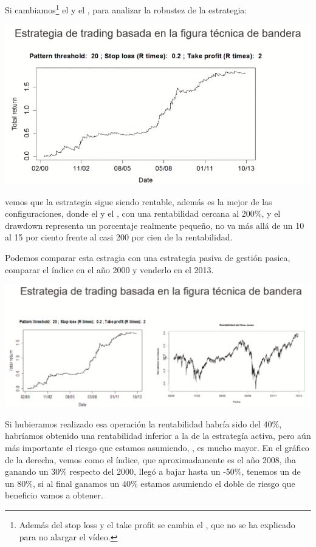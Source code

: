 \begin{enumerate}
    Si cambiamos\footnote{Además del stop loss y el take profit se cambia el , que no se ha explicado para no alargar el vídeo.} el  y el , para analizar la robustez de la estrategia:
    \begin{center}
        \includegraphics[scale=.65]{images/mod03-16.png}
    \end{center}
    vemos que la estrategia sigue siendo rentable, además es la mejor de las configuraciones, donde el  y el , con una rentabilidad cercana al 200\%, y el drawdown representa un porcentaje realmente pequeño, no va más allá de un 10 al 15 por ciento frente al casi 200 por cien de la rentabilidad.
\end{enumerate}

Podemos comparar esta estragia con una estrategia pasiva de gestión pasica, comparar el índice en el año 2000 y venderlo en el 2013.
\begin{center}
    \includegraphics[scale=.65]{images/mod03-17.png}
\end{center}
Si hubieramos realizado esa operación la rentabilidad habría sido del 40\%, habríamos obtenido una rentabilidad inferior a la de la estrategía activa, pero aún más importante el riesgo que estamos asumiendo, , es mucho mayor. En el gráfico de la derecha, vemos como el índice, que aproximadamente es el año 2008, iba ganando un 30\% respecto del 2000, llegó a bajar hasta un -50\%, tenemos un  de un 80\%, si al final ganamos un 40\% estamos asumiendo el doble de riesgo que beneficio vamos a obtener.

